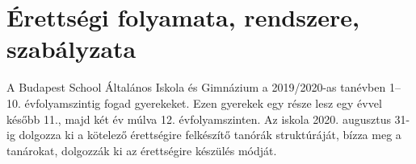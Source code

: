 \section{Érettségi folyamata, rendszere, szabályzata}
\label{sec:erettsegi_kesobb}
A Budapest School Általános Iskola és Gimnázium a 2019/2020-as tanévben 1--10. évfolyamszintig fogad gyerekeket. Ezen gyerekek egy része lesz egy évvel később 11., majd két év múlva 12. évfolyamszinten. Az iskola 2020. augusztus 31-ig dolgozza ki a kötelező érettségire felkészítő tanórák struktúráját, bízza meg a tanárokat, dolgozzák ki az érettségire készülés módját. 